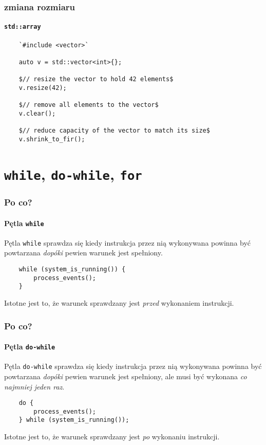 \documentclass[aspectratio=169]{beamer}
\begin{document}
\begin{frame}[fragile]
    \frametitle{zmiana rozmiaru}
    \framesubtitle{{\tt std::array}}

    {\footnotesize
    \begin{lstlisting}
    `#include <vector>`

    auto v = std::vector<int>{};

    $// resize the vector to hold 42 elements$
    v.resize(42);

    $// remove all elements to the vector$
    v.clear();

    $// reduce capacity of the vector to match its size$
    v.shrink_to_fir();
    \end{lstlisting}}
\end{frame}

\section{{\tt while}, {\tt do-while}, {\tt for}}

\begin{frame}[fragile]
    \frametitle{Po co?}
    \framesubtitle{Pętla {\tt while}}

    Pętla {\tt while} sprawdza się kiedy instrukcja przez nią wykonywana powinna
    być powtarzana \emph{dopóki} pewien warunek jest spełniony.

    \begin{lstlisting}
    while (system_is_running()) {
        process_events();
    }
    \end{lstlisting}

    Istotne jest to, że warunek sprawdzany jest \emph{przed} wykonaniem
    instrukcji.
\end{frame}

\begin{frame}[fragile]
    \frametitle{Po co?}
    \framesubtitle{Pętla {\tt do-while}}

    Pętla {\tt do-while} sprawdza się kiedy instrukcja przez nią wykonywana powinna
    być powtarzana \emph{dopóki} pewien warunek jest spełniony, ale musi być
    wykonana \emph{co najmniej jeden raz}.

    \begin{lstlisting}
    do {
        process_events();
    } while (system_is_running());
    \end{lstlisting}

    Istotne jest to, że warunek sprawdzany jest \emph{po} wykonaniu
    instrukcji.
\end{frame}
\end{document}
